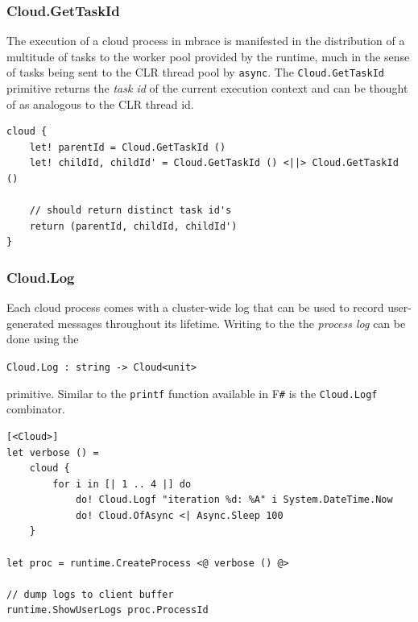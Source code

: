 \documentclass[9pt,a4paper]{article}
\newcommand{\mbrace}{mbrace}
\newcommand{\fsharp}{F\texttt \#}
\newcommand{\centertt}[1]{\begin{center}\texttt{#1}\end{center}}
\begin{document}
\subsubsection*{Cloud.GetTaskId}

The execution of a cloud process in \mbrace{} is manifested in the distribution of
a multitude of tasks to the worker pool provided by the runtime, much in the
sense of tasks being sent to the CLR thread pool by \texttt{async}.
The \texttt{Cloud.GetTaskId} primitive returns the \emph{task id} of the current
execution context and can be thought of as analogous to the CLR thread id.
\begin{lstlisting}
cloud {
	let! parentId = Cloud.GetTaskId ()
	let! childId, childId' = Cloud.GetTaskId () <||> Cloud.GetTaskId ()
	
	// should return distinct task id's
	return (parentId, childId, childId')
}
\end{lstlisting}

\subsubsection*{Cloud.Log}

Each cloud process comes with a cluster-wide log that can be used to record
user-generated messages throughout its lifetime. Writing to the
the \emph{process log} can be done using the
\centertt{Cloud.Log : string -> Cloud<unit>}
primitive. Similar to the \texttt{printf} function available in \fsharp{} 
is the \texttt{Cloud.Logf} combinator.
\begin{lstlisting}
[<Cloud>]
let verbose () =
    cloud {
        for i in [| 1 .. 4 |] do
            do! Cloud.Logf "iteration %d: %A" i System.DateTime.Now
            do! Cloud.OfAsync <| Async.Sleep 100
    }

let proc = runtime.CreateProcess <@ verbose () @>

// dump logs to client buffer
runtime.ShowUserLogs proc.ProcessId
\end{lstlisting}
\end{document}

